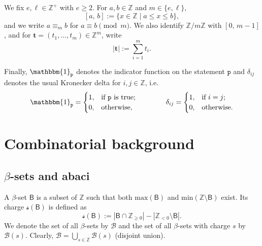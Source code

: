\documentclass[11pt,a4paper,reqno]{amsart}
\numberwithin{equation}{section}
\theoremstyle{plain}
\theoremstyle{definition}
\theoremstyle{remark}
\numberwithin{equation}{section}
\newcommand{\bbone}{\mathbbm{1}}
\newcommand{\fs}{\mathcal{s}}
\newcommand{\bt}{\mathbf{t}}
\renewcommand{\min}{\mathrm{min}}
\renewcommand{\max}{\mathrm{max}}
\newcommand{\ZZ}{\mathbb{Z}}
\newcommand{\BB}{\mathcal{B}}
\newcommand{\B}{\mathsf{B}}
\def\Z{{\mathbb Z}}
\begin{document}
We fix $e,\ell \in \mathbb{Z}^+$ with $e \geq 2$. For $a,b \in \ZZ$ and $m \in \{e,\ell\}$,
$$[a,\, b] := \{ x \in \ZZ \mid a \leq x \leq b \},$$
and we write $a \equiv_m b$ for $a \equiv b \pmod m$.
We also identify $\ZZ/m\ZZ$ with $[0,\, m-1]$, and for $\bt = (t_1,\dotsc, t_m) \in \ZZ^m$, write
$$|\bt| := \sum_{i=1}^m t_i.$$

Finally, $\bbone_{\mathtt{p}}$ denotes the indicator function on the statement $\mathtt{p}$ and $\delta_{ij}$ denotes the usual Kronecker delta for $i,j \in \ZZ$, i.e.\ $$\bbone_{\mathtt{p}} = \begin{cases}
1, &\text{if $\mathtt{p}$ is true};\\
0, &\text{otherwise},
\end{cases}
\qquad \qquad
\delta_{ij} = 
\begin{cases}
1, &\text{if } i = j;\\
0, &\text{otherwise}.
\end{cases}
$$


\section{Combinatorial background}




\subsection{$\beta$-sets and abaci} \label{SS:beta sets}

A  $\beta$-set $\B$ is a subset of $\Z$ such that both $\max(\B)$ and $\min(\Z \setminus \B)$ exist. Its  \index{charge!$\fs(\B)$} charge $\fs(\B)$ is defined as
$$\fs(\B) := |\B \cap \Z_{\geq 0}| - |\Z_{<0} \setminus \B|.$$
We denote the set of all $\beta$-sets by $\BB$ and the set of all $\beta$-sets with charge $s$ by $\BB(s)$.  Clearly, $\BB= \bigcup_{s \in \Z} \BB(s)$ (disjoint union).
\end{document}

